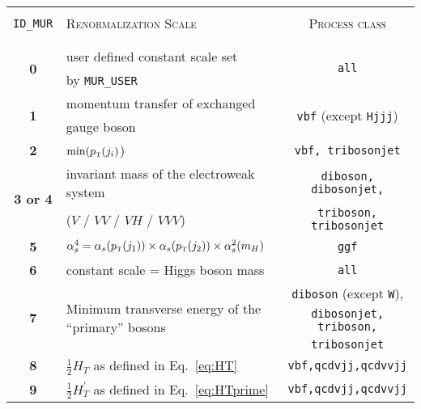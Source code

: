 \documentclass[english,12pt]{article}
\newcommand\sss{\mathchoice%
{\displaystyle}%
{\scriptstyle}%
{\scriptscriptstyle}%
{\scriptscriptstyle}%
}
\newcommand\pt{p_{\sss\rm T}}
\begin{document}
\begin{itemize}
\begin{table}[t!]
\begin{center}
\vspace{0.2cm}
\label{tab:fscales}
\end{center}
\end{table}
%
%
\begin{table}[t!]
\newcommand{\lstrut}{{$\strut\atop\strut$}}
\begin{center}
\begin{tabular}{c|p{7.5cm}|c}
\hline
&&\\
{\tt ID\_MUR } & \textsc{Renormalization Scale} & \textsc{Process class} \\
&&\\
\hline
&&\\
\multirow{2}{*}{\bf 0} & user defined constant scale set & \multirow{2}{*}{\tt all}\\
 & by {\tt MUR\_USER} & \\
\multirow{2}{*}{\bf 1} & momentum transfer of exchanged &  \multirow{2}{*}{{\tt vbf} (except {\tt Hjjj})} \\
 & gauge boson &  \\
\multirow{2}{*}{\bf 2} & \multirow{2}{*}{$\min(\pt(j_{i})$)} & \multirow{2}{*}{\tt vbf, tribosonjet} \\
 & & \\
\multirow{2}{*}{\bf 3 or 4} & invariant mass of the electroweak system & {\tt diboson, dibosonjet,} \\ 
 & ($V$ / $VV$ / $VH$ / $VVV$) & {\tt triboson, tribosonjet} \\ 
\multirow{2}{*}{\bf 5} & \multirow{2}{*}{$\alpha^{4}_s=\alpha_s(\pt(j_{1})) \times \alpha_s(\pt(j_{2})) \times \alpha^{2}_s(m_{H})$} & \multirow{2}{*}{\tt ggf}\\ 
 & & \\
\multirow{2}{*}{\bf 6} & \multirow{2}{*}{constant scale = Higgs boson mass} & \multirow{2}{*}{\tt all}\\ 
 & & \\
\multirow{3}{*}{\bf 7} & \multirow{3}{7cm}{Minimum transverse energy of the ``primary'' bosons} & {\tt diboson} (except {\tt W}), \\
 & & {\tt dibosonjet, triboson,} \\
 & & {\tt tribosonjet} \\
\multirow{2}{*}{\bf 8} & \multirow{2}{*}{$\frac{1}{2}H_T$ as defined in Eq.~\eqref{eq:HT}} & \multirow{2}{*}{\tt vbf,qcdvjj,qcdvvjj}  \\
 & & \\
\multirow{2}{*}{\bf 9} & \multirow{2}{*}{$\frac{1}{2}H_T^\prime$ as defined in Eq.~\eqref{eq:HTprime}} & \multirow{2}{*}{\tt vbf,qcdvjj,qcdvvjj}  \\

\end{tabular}
\end{center}
\end{table}
\end{itemize}
\end{document}
